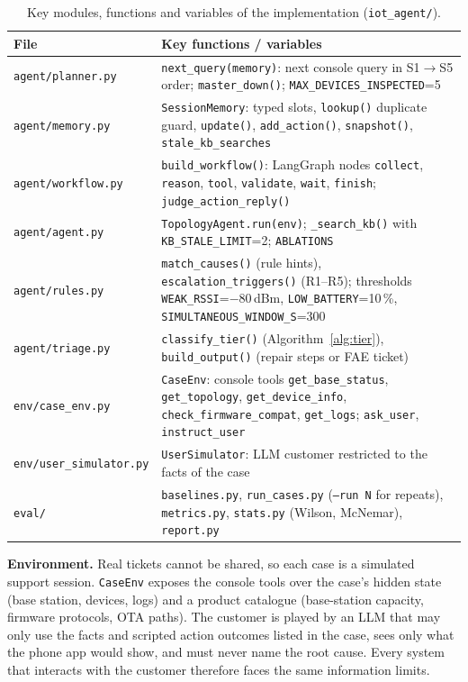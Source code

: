 \documentclass[12pt,a4paper]{article}
\newcommand{\code}[1]{\texttt{\small #1}}
\begin{document}
\begin{table}[t]
\centering\small
\caption{Key modules, functions and variables of the implementation (\code{iot\_agent/}).}\label{tab:code}
\footnotesize\renewcommand{\code}[1]{\texttt{#1}}
\begin{tabularx}{\linewidth}{@{}lX@{}}
\toprule
File & Key functions / variables \\
\midrule
\code{agent/planner.py} & \code{next\_query(memory)}: next console query in S1$\to$S5 order; \code{master\_down()}; \code{MAX\_DEVICES\_INSPECTED}=5 \\
\code{agent/memory.py} & \code{SessionMemory}: typed slots, \code{lookup()} duplicate guard, \code{update()}, \code{add\_action()}, \code{snapshot()}, \code{stale\_kb\_searches} \\
\code{agent/workflow.py} & \code{build\_workflow()}: LangGraph nodes \code{collect}, \code{reason}, \code{tool}, \code{validate}, \code{wait}, \code{finish}; \code{judge\_action\_reply()} \\
\code{agent/agent.py} & \code{TopologyAgent.run(env)}; \code{\_search\_kb()} with \code{KB\_STALE\_LIMIT}=2; \code{ABLATIONS} \\
\code{agent/rules.py} & \code{match\_causes()} (rule hints), \code{escalation\_triggers()} (R1--R5); thresholds \code{WEAK\_RSSI}=$-80$\,dBm, \code{LOW\_BATTERY}=10\,\%, \code{SIMULTANEOUS\_WINDOW\_S}=300 \\
\code{agent/triage.py} & \code{classify\_tier()} (Algorithm~\ref{alg:tier}), \code{build\_output()} (repair steps or FAE ticket) \\
\code{env/case\_env.py} & \code{CaseEnv}: console tools \code{get\_base\_status}, \code{get\_topology}, \code{get\_device\_info}, \code{check\_firmware\_compat}, \code{get\_logs}; \code{ask\_user}, \code{instruct\_user} \\
\code{env/user\_simulator.py} & \code{UserSimulator}: LLM customer restricted to the facts of the case \\
\code{eval/} & \code{baselines.py}, \code{run\_cases.py} (\code{--run N} for repeats), \code{metrics.py}, \code{stats.py} (Wilson, McNemar), \code{report.py} \\
\bottomrule
\end{tabularx}
\end{table}

\textbf{Environment.} Real tickets cannot be shared, so each case is a simulated support session. \code{CaseEnv}
exposes the console tools over the case's hidden state (base station, devices, logs) and a product catalogue
(base-station capacity, firmware protocols, OTA paths). The customer is played by an LLM that may only use the
facts and scripted action outcomes listed in the case, sees only what the phone app would show, and must never
name the root cause. Every system that interacts with the customer therefore faces the same information limits.
\end{document}
